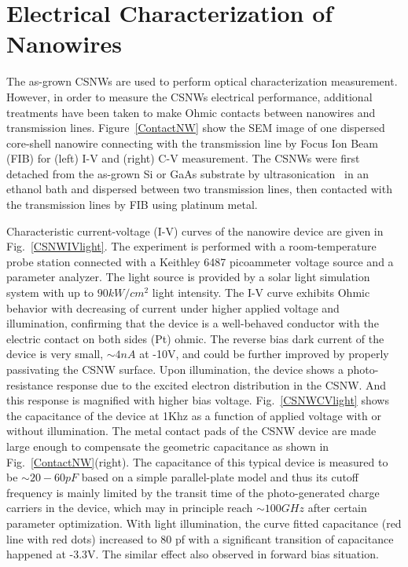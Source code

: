 \section{Electrical Characterization of Nanowires}

The as-grown CSNWs are used to perform optical characterization measurement.
However, in order to measure the CSNWs electrical performance, additional
treatments have been taken to make Ohmic contacts between nanowires and
transmission lines. Figure~\ref{ContactNW} show the SEM image of one dispersed
core-shell nanowire connecting with the transmission line by Focus Ion Beam
(FIB) for (left) I-V and (right) C-V measurement. The CSNWs were first detached
from the as-grown Si or GaAs substrate by
ultrasonication~\cite{wang2007direct,wan2004fabrication} in an ethanol bath and
dispersed between two transmission lines, then contacted with the transmission
lines by FIB using platinum metal.

Characteristic current-voltage (I-V) curves of the nanowire device are given in
Fig.~\ref{CSNWIVlight}. The experiment is performed with a room-temperature
probe station connected with a Keithley 6487 picoammeter voltage source and a
parameter analyzer. The light source is provided by a solar light simulation
system with up to $90 kW/{cm}^2$ light intensity. The I-V curve exhibits Ohmic
behavior with decreasing of current under higher applied voltage and
illumination, confirming that the device is a well-behaved conductor with the
electric contact on both sides (Pt) ohmic. The reverse bias dark current of the
device is very small, $\sim4nA$ at -10V, and could be further improved by
properly passivating the CSNW surface. Upon illumination, the device shows a
photo-resistance response due to the excited electron distribution in the CSNW.
And this response is magnified with higher bias voltage.
Fig.~\ref{CSNWCVlight} shows the capacitance of the device at 1Khz as a
function of applied voltage with or without illumination. The metal contact
pads of the CSNW device are made large enough to compensate the geometric
capacitance as shown in Fig.~\ref{ContactNW}(right).  The capacitance of this
typical device is measured to be $\sim20-60 pF$ based on a simple
parallel-plate model and thus its cutoff frequency is mainly limited by the
transit time of the photo-generated charge carriers in the device, which may in
principle reach $\sim100 GHz$ after certain parameter optimization. With light
illumination, the curve fitted capacitance (red line with red dots) increased
to 80 pf with a significant transition of capacitance happened at -3.3V. The
similar effect also observed in forward bias situation.

